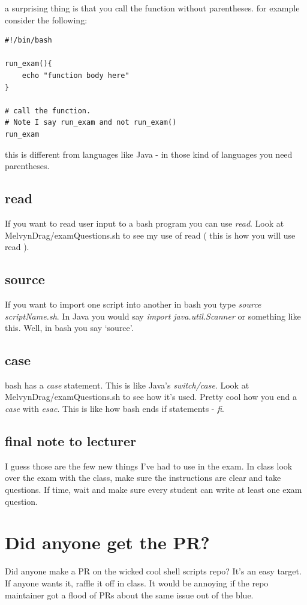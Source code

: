 \documentclass[12pt,a4paper]{article}
\begin{document}
a surprising thing is that you call the function without parentheses. for
example consider the following:

\begin{lstlisting}[style=sh]
#!/bin/bash

run_exam(){
	echo "function body here"	
}

# call the function. 
# Note I say run_exam and not run_exam()
run_exam
\end{lstlisting}

this is different from languages like Java - in those kind of languages you need
parentheses.

\subsection{read}
If you want to read user input to a bash program you can use \textit{read}. Look
at MelvynDrag/examQuestions.sh to see my use of read ( this is how you will use
read ).

\subsection{source}
If you want to import one script into another in bash you type \textit{source
scriptName.sh}. In Java you would say \textit{import java.util.Scanner} or
something like this. Well, in bash you say `source'.

\subsection{case}
bash has a \textit{case} statement. This is like Java's \textit{switch/case}.
Look at MelvynDrag/examQuestions.sh to see how it's used. Pretty cool how you
end a \textit{case} with \textit{esac}. This is like how bash ends if statements
- \textit{fi}.

\subsection{final note to lecturer}
I guess those are the few new things I've had to use in the exam. In class look over the exam with the class, make sure the instructions are clear
and take questions. If time, wait and make sure every student can write at least
one exam question.

\section{Did anyone get the PR?}
Did anyone make a PR on the wicked cool shell scripts repo? It's an easy target.
If anyone wants it, raffle it off in class. It would be annoying if the repo
maintainer got a flood of PRs about the same issue out of the blue.
\end{document}
